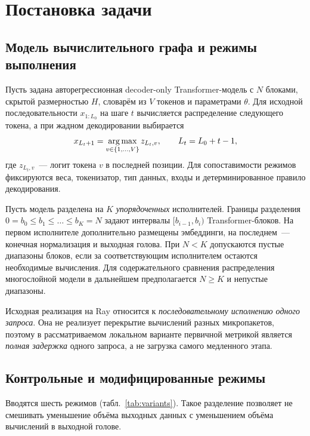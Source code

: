 \section{Постановка задачи}

\subsection{Модель вычислительного графа и режимы выполнения}

Пусть задана авторегрессионная decoder-only Transformer-модель с $N$ блоками, скрытой размерностью $H$, словарём из $V$ токенов и параметрами $\theta$. Для исходной последовательности $x_{1:L_0}$ на шаге $t$ вычисляется распределение следующего токена, а при жадном декодировании выбирается
\begin{equation}
 x_{L_t+1}=\operatorname*{arg\,max}_{v\in\{1,\ldots,V\}} z_{L_t,v},\qquad L_t=L_0+t-1,
 \label{eq:greedy}
\end{equation}
где $z_{L_t,v}$~--- логит токена $v$ в последней позиции. Для сопоставимости режимов фиксируются веса, токенизатор, тип данных, входы и детерминированное правило декодирования.

Пусть модель разделена на $K$ \emph{упорядоченных} исполнителей. Границы разделения $0=b_0\le b_1\le\ldots\le b_K=N$ задают интервалы $[b_{i-1},b_i)$ Transformer-блоков. На первом исполнителе дополнительно размещены эмбеддинги, на последнем~--- конечная нормализация и выходная голова. При $N<K$ допускаются пустые диапазоны блоков, если за соответствующим исполнителем остаются необходимые вычисления. Для содержательного сравнения распределения многослойной модели в дальнейшем предполагается $N\ge K$ и непустые диапазоны.

Исходная реализация на Ray относится к \emph{последовательному исполнению одного запроса}. Она не реализует перекрытие вычислений разных микропакетов, поэтому в рассматриваемом локальном варианте первичной метрикой является \emph{полная задержка} одного запроса, а не загрузка самого медленного этапа.

\subsection{Контрольные и модифицированные режимы}

Вводятся шесть режимов (табл.~\ref{tab:variants}). Такое разделение позволяет не смешивать уменьшение объёма выходных данных с уменьшением объёма вычислений в выходной голове.


